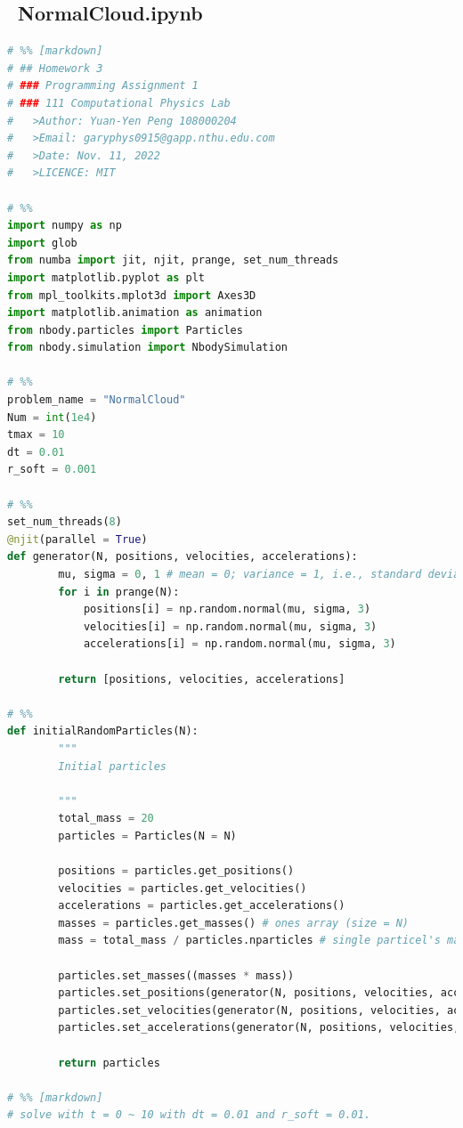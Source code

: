 \documentclass[12pt]{article}
\begin{document}
    \subsection{{\ttfamily\ NormalCloud.ipynb}}
      \begin{lstlisting}[language={Python}]
# %% [markdown]
# ## Homework 3
# ### Programming Assignment 1
# ### 111 Computational Physics Lab  
#   >Author: Yuan-Yen Peng 108000204  
#   >Email: garyphys0915@gapp.nthu.edu.com  
#   >Date: Nov. 11, 2022  
#   >LICENCE: MIT

# %%
import numpy as np
import glob
from numba import jit, njit, prange, set_num_threads
import matplotlib.pyplot as plt
from mpl_toolkits.mplot3d import Axes3D
import matplotlib.animation as animation
from nbody.particles import Particles
from nbody.simulation import NbodySimulation

# %%
problem_name = "NormalCloud"
Num = int(1e4)
tmax = 10
dt = 0.01
r_soft = 0.001

# %%
set_num_threads(8)
@njit(parallel = True)
def generator(N, positions, velocities, accelerations):
        mu, sigma = 0, 1 # mean = 0; variance = 1, i.e., standard deviation = sqrt(var) = 1
        for i in prange(N):
            positions[i] = np.random.normal(mu, sigma, 3)
            velocities[i] = np.random.normal(mu, sigma, 3)
            accelerations[i] = np.random.normal(mu, sigma, 3)
            
        return [positions, velocities, accelerations]

# %%
def initialRandomParticles(N):
        """
        Initial particles

        """
        total_mass = 20
        particles = Particles(N = N)
        
        positions = particles.get_positions()
        velocities = particles.get_velocities()
        accelerations = particles.get_accelerations()
        masses = particles.get_masses() # ones array (size = N)
        mass = total_mass / particles.nparticles # single particel's mass
        
        particles.set_masses((masses * mass))
        particles.set_positions(generator(N, positions, velocities, accelerations)[0])
        particles.set_velocities(generator(N, positions, velocities, accelerations)[1])
        particles.set_accelerations(generator(N, positions, velocities, accelerations)[2])

        return particles

# %% [markdown]
# solve with t = 0 ~ 10 with dt = 0.01 and r_soft = 0.01.


\end{lstlisting}
\end{document}
